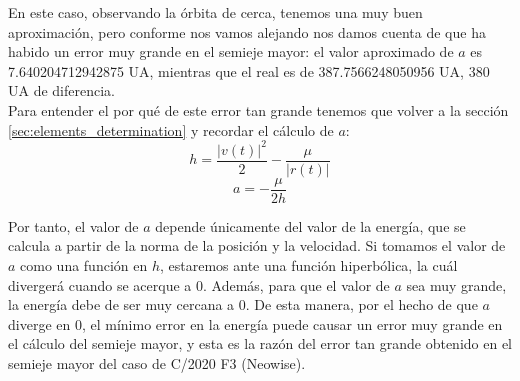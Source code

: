En este caso, observando la órbita de cerca, tenemos una muy buen aproximación, pero conforme nos vamos alejando nos damos cuenta de que ha habido un error muy grande en el semieje mayor: el valor aproximado de $a$ es 7.640204712942875 UA, mientras que el real es de 387.7566248050956 UA, 380 UA de diferencia.\\

Para entender el por qué de este error tan grande tenemos que volver a la sección \ref{sec:elements_determination} y recordar el cálculo de $a$:
\[
h=\frac{|v(t)|^2}{2}-\frac{\mu}{|r(t)|}
\]
\[
a=-\frac{\mu}{2h}
\]

Por tanto, el valor de $a$ depende únicamente del valor de la energía, que se calcula a partir de la norma de la posición y la velocidad. Si tomamos el valor de $a$ como una función en $h$, estaremos ante una función hiperbólica, la cuál divergerá cuando se acerque a 0. Además, para que el valor de $a$ sea muy grande, la energía debe de ser muy cercana a 0. De esta manera, por el hecho de que $a$ diverge en 0, el mínimo error en la energía puede causar un error muy grande en el cálculo del semieje mayor, y esta es la razón del error tan grande obtenido en el semieje mayor del caso de C/2020 F3 (Neowise).


\newpage
\thispagestyle{empty}
